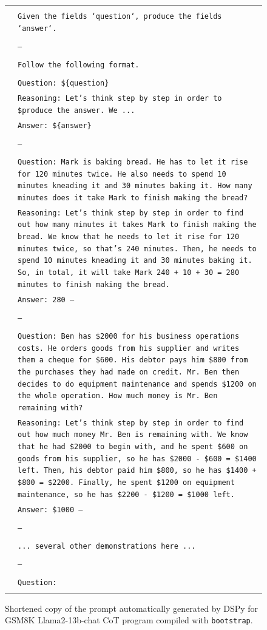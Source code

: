 { %

\newcommand{\pWidth}{5in}
\newcommand{\pStart}{\setcounter{pCount}{1}}
\newcommand{\pRow}[1]{\texttt{\fontsize{6pt}{1pt}\selectfont\color{gray}\arabic{pCount}}&\texttt{\fontsize{6pt}{1pt}\selectfont#1}\stepcounter{pCount}\\}
\newcommand{\pVar}[1]{\textbf{\{#1\}}}
\newcommand{\pBlank}{\_\_\_\_\_}
\begin{figure}[p]
\begin{center}\scriptsize
\begin{tabular}{|rp{\pWidth}|}\hline\pStart&\\
\pRow{Given the fields `question`, produce the fields `answer`.}
\pRow{}
\pRow{---}
\pRow{}
\pRow{Follow the following format.}
\pRow{}
\pRow{Question: \$\{question\}}
\pRow{Reasoning: Let's think step by step in order to \${produce the answer}. We ...}
\pRow{Answer: \$\{answer\}}
\pRow{}
\pRow{---}
\pRow{}
\pRow{Question: Mark is baking bread. He has to let it rise for 120 minutes twice. He also needs to spend 10 minutes kneading it and 30 minutes baking it. How many minutes does it take Mark to finish making the bread?}
\pRow{Reasoning: Let's think step by step in order to find out how many minutes it takes Mark to finish making the bread. We know that he needs to let it rise for 120 minutes twice, so that's 240 minutes. Then, he needs to spend 10 minutes kneading it and 30 minutes baking it. So, in total, it will take Mark 240 + 10 + 30 = 280 minutes to finish making the bread.}
\pRow{Answer: 280 ---}
\pRow{}
\pRow{---}
\pRow{}
\pRow{Question: Ben has \$2000 for his business operations costs. He orders goods from his supplier and writes them a cheque for \$600. His debtor pays him \$800 from the purchases they had made on credit. Mr. Ben then decides to do equipment maintenance and spends \$1200 on the whole operation. How much money is Mr. Ben remaining with?}
\pRow{Reasoning: Let's think step by step in order to find out how much money Mr. Ben is remaining with. We know that he had \$2000 to begin with, and he spent \$600 on goods from his supplier, so he has \$2000 - \$600 = \$1400 left. Then, his debtor paid him \$800, so he has \$1400 + \$800 = \$2200. Finally, he spent \$1200 on equipment maintenance, so he has \$2200 - \$1200 = \$1000 left.}
\pRow{Answer: \$1000 ---}
\pRow{}
\pRow{---}
\pRow{}
\pRow{... several other demonstrations here ...}
\pRow{}
\pRow{---}
\pRow{}
\pRow{Question:}
&\\\hline\end{tabular}
\caption{Shortened copy of the prompt automatically generated by DSPy for GSM8K Llama2-13b-chat CoT program compiled with \texttt{bootstrap}.}
\label{fig:gms8k_bootstrap2_shortened}
\end{center}
\end{figure}

} %



